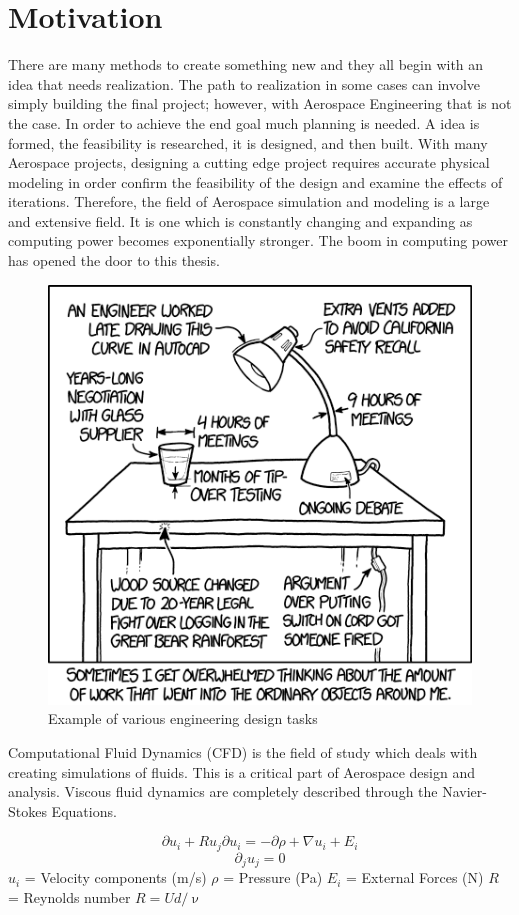 \section{Motivation}
There are many methods to create something new and they all begin with an idea that needs realization. The path to realization in some cases can involve simply building the final project; however, with Aerospace Engineering that is not the case. In order to achieve the end goal much planning is needed. A idea is formed, the feasibility is researched, it is designed, and then built. With many Aerospace projects, designing a cutting edge project requires accurate physical modeling in order confirm the feasibility of the design and examine the effects of iterations. Therefore, the field of Aerospace simulation and modeling is a large and extensive field. It is one which is constantly changing and expanding as computing power becomes exponentially stronger. The boom in computing power has opened the door to this thesis. \par

\begin{figure}[h]
    \includegraphics[width=.5\textwidth]{figures/work.png}
    \centering
    \caption{Example of various engineering design tasks \cite{xkcd}}
    \label{fig:xkcd}
\end{figure}

\indent Computational Fluid Dynamics (CFD) is the field of study which deals with creating simulations of fluids. This is a critical part of Aerospace design and analysis. Viscous fluid dynamics are completely described through the Navier-Stokes Equations.

\begin{equation}
    \label{eqn:navier_1}
    \partial u_i + R u_j \partial u_i = -\partial \rho + \nabla u_i + E_i 
\end{equation}
\begin{equation}
    \label{eqn:navier_2}
        \partial_j u_j = 0  
\end{equation}
\(u_i\) = Velocity components (m/s) \newline
\(\rho\) = Pressure (Pa) \newline
\(E_i\) = External Forces (N) \newline
\(R\) = Reynolds number \(R = U d / \upnu \)  \par

